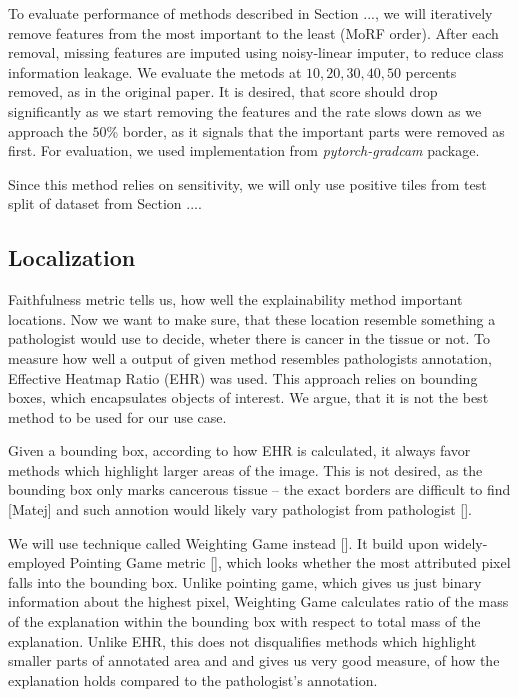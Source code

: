 To evaluate performance of methods described in Section ..., we will iteratively remove features from the most important to the least (MoRF order). After each removal, missing features are imputed using noisy-linear imputer, to reduce class information leakage. We evaluate the metods at $10, 20, 30, 40, 50$ percents removed, as in the original paper. It is desired, that score should drop significantly as we start removing the features and the rate slows down as we approach the $50$\% border, as it signals that the important parts were removed as first. For evaluation, we used implementation from \emph{pytorch-gradcam} package.

Since this method relies on sensitivity, we will only use positive tiles from test split of dataset from Section ....

\subsection*{Localization}
Faithfulness metric tells us, how well the explainability method important locations. Now we want to make sure, that these location resemble something a pathologist would use to decide, wheter there is cancer in the tissue or not. To measure how well a output of given method resembles pathologists annotation, Effective Heatmap Ratio (EHR) was used. This approach relies on bounding boxes, which encapsulates objects of interest. We argue, that it is not the best method to be used for our use case.

Given a bounding box, according to how EHR is calculated, it always favor methods which highlight larger areas of the image. This is not desired, as the bounding box only marks cancerous tissue -- the exact borders are difficult to find [Matej] and such annotion would likely vary pathologist from pathologist [].


We will use technique called Weighting Game instead []. It build upon widely-employed Pointing Game metric [], which looks whether the most attributed pixel falls into the bounding box. Unlike pointing game, which gives us just binary information about the highest pixel, Weighting Game calculates ratio of the mass of the explanation within the bounding box with respect to total mass of the explanation. Unlike EHR, this does not disqualifies methods which highlight smaller parts of annotated area and and gives us very good measure, of how the explanation holds compared to the pathologist's annotation.

